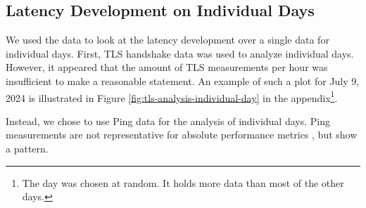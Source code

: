 \subsection{Latency Development on Individual Days} \label{sec:latency-individual-days}

We used the data to look at the latency development over a single data for
individual days. First, TLS handshake data was used to analyze individual days. However,
it appeared that the amount of TLS measurements per hour was insufficient to
make a reasonable statement. An example of such a plot for July 9, 2024 is
illustrated in Figure \ref{fig:tls-analysis-individual-day} in the
appendix\footnote{The day was chosen at random. It holds more data than most of
	the other days.}.

Instead, we chose to use Ping data for the analysis of individual days. Ping
measurements are not representative for absolute performance metrics
\cite{DBLP:conf/imc/PelsserCVB13}, but show a pattern.

